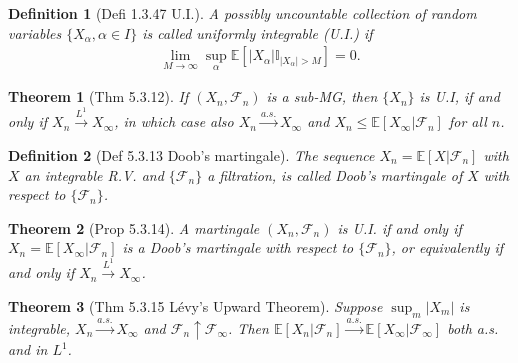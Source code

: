 \documentclass[11pt,a4paper]{article}
\numberwithin{equation}{section}%
\newtheorem{theorem}{Theorem}[]
\newtheorem{definition}{Definition}[]
\begin{document}
\begin{definition}[Defi 1.3.47 U.I.]
    A possibly uncountable collection of random variables $\{X_{\alpha}, \alpha \in I\}$ is called uniformly integrable (U.I.) if
    \begin{align*}
        \lim_{M \to \infty} \sup_{\alpha} \mathbb{E}[|X_{\alpha}| \mathbb{I}_{|X_{\alpha}| > M}] = 0.
    \end{align*}
\end{definition}

\begin{theorem}[Thm 5.3.12]
    If $(X_n, \mathcal{F}_n)$ is a sub-MG, then $\{X_n\}$ is U.I, if and only if $X_n \xrightarrow{L^1} X_{\infty}$, in which case also $X_n \xrightarrow{a.s.} X_{\infty}$ and $X_n \leq \mathbb{E}[X_{\infty} | \mathcal{F}_n]$ for all $n$.
\end{theorem}

\begin{definition}[Def 5.3.13 Doob's martingale]
    The sequence $X_n = \mathbb{E}[X | \mathcal{F}_n]$ with $X$ an integrable R.V. and $\{\mathcal{F}_n\}$ a filtration, is called Doob's martingale of $X$ with respect to $\{\mathcal{F}_n\}$.
\end{definition}



\begin{theorem}[Prop 5.3.14]
    A martingale $(X_n, \mathcal{F}_n)$ is U.I. if and only if $X_n = \mathbb{E}[X_{\infty} | \mathcal{F}_n]$ is a Doob's martingale with respect to $\{\mathcal{F}_n\}$, or equivalently if and only if $X_n \xrightarrow{L^1} X_{\infty}$.
\end{theorem}

\begin{theorem}[Thm 5.3.15 L\'evy's Upward Theorem]
    Suppose $\sup_m |X_m|$ is integrable, $X_n \xrightarrow{a.s.} X_{\infty}$ and $\mathcal{F}_n \uparrow \mathcal{F}_{\infty}$. Then $\mathbb{E}[X_n | \mathcal{F}_n] \xrightarrow{a.s.} \mathbb{E}[X_{\infty} | \mathcal{F}_{\infty}]$ both a.s. and in $L^1$.
    
\end{theorem}
\end{document}
